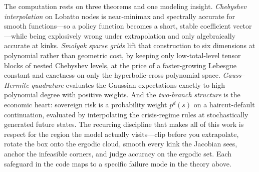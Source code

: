 \documentclass[11pt]{article}
\begin{document}
The computation rests on three theorems and one modeling insight.
\emph{Chebyshev interpolation} on Lobatto nodes is near-minimax and
spectrally accurate for smooth functions---so a policy function becomes a
short, stable coefficient vector---while being explosively wrong under
extrapolation and only algebraically accurate at kinks. \emph{Smolyak sparse
grids} lift that construction to six dimensions at polynomial rather than
geometric cost, by keeping only low-total-level tensor blocks of nested
Chebyshev levels, at the price of a faster-growing Lebesgue constant and
exactness on only the hyperbolic-cross polynomial space. \emph{Gauss--Hermite
quadrature} evaluates the Gaussian expectations exactly to high polynomial
degree with positive weights. And the \emph{two-branch structure} is the
economic heart: sovereign risk is a probability weight $p^d(s)$ on a
haircut-default continuation, evaluated by interpolating the crisis-regime
rules at stochastically generated future states. The recurring discipline
that makes all of this work is respect for the region the model actually
visits---clip before you extrapolate, rotate the box onto the ergodic cloud,
smooth every kink the Jacobian sees, anchor the infeasible corners, and
judge accuracy on the ergodic set. Each safeguard in the code maps to a
specific failure mode in the theory above.
\end{document}
